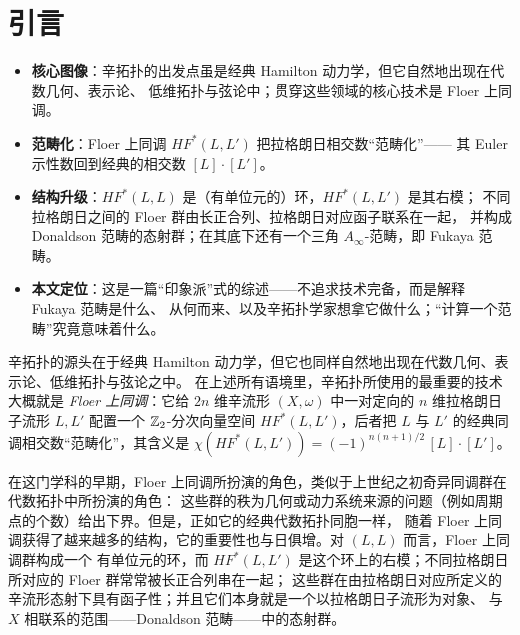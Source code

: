 
\section{引言}\label{Sec:Introduction}

\begin{keypoints}
\begin{itemize}
  \item \textbf{核心图像}：辛拓扑的出发点虽是经典 Hamilton 动力学，但它自然地出现在代数几何、表示论、
        低维拓扑与弦论中；贯穿这些领域的核心技术是 Floer 上同调。
  \item \textbf{范畴化}：Floer 上同调 $HF^*(L,L')$ 把拉格朗日相交数“范畴化”——
        其 Euler 示性数回到经典的相交数 $[L]\cdot[L']$。
  \item \textbf{结构升级}：$HF^*(L,L)$ 是（有单位元的）环，$HF^*(L,L')$ 是其右模；
        不同拉格朗日之间的 Floer 群由长正合列、拉格朗日对应函子联系在一起，
        并构成 Donaldson 范畴的态射群；在其底下还有一个三角 $A_\infty$-范畴，即 Fukaya 范畴。
  \item \textbf{本文定位}：这是一篇“印象派”式的综述——不追求技术完备，而是解释 Fukaya 范畴是什么、
        从何而来、以及辛拓扑学家想拿它做什么；“计算一个范畴”究竟意味着什么。
\end{itemize}
\end{keypoints}

辛拓扑的源头在于经典 Hamilton 动力学，但它也同样自然地出现在代数几何、表示论、低维拓扑与弦论之中。
在上述所有语境里，辛拓扑所使用的最重要的技术大概就是 \emph{Floer 上同调}：它给 $2n$ 维辛流形
$(X,\omega)$ 中一对定向的 $n$ 维拉格朗日子流形 $L, L'$ 配置一个 $\mathbb{Z}_2$-分次向量空间
$HF^*(L,L')$，后者把 $L$ 与 $L'$ 的经典同调相交数“范畴化”，其含义是
$\chi(HF^*(L,L')) = (-1)^{n(n+1)/2}\, [L]\cdot[L']$。

在这门学科的早期，Floer 上同调所扮演的角色，类似于上世纪之初奇异同调群在代数拓扑中所扮演的角色：
这些群的秩为几何或动力系统来源的问题（例如周期点的个数）给出下界。但是，正如它的经典代数拓扑同胞一样，
随着 Floer 上同调获得了越来越多的结构，它的重要性也与日俱增。对 $(L,L)$ 而言，Floer 上同调群构成一个
有单位元的环，而 $HF^*(L,L')$ 是这个环上的右模；不同拉格朗日所对应的 Floer 群常常被长正合列串在一起；
这些群在由拉格朗日对应所定义的辛流形态射下具有函子性；并且它们本身就是一个以拉格朗日子流形为对象、
与 $X$ 相联系的范围——Donaldson 范畴——中的态射群。

